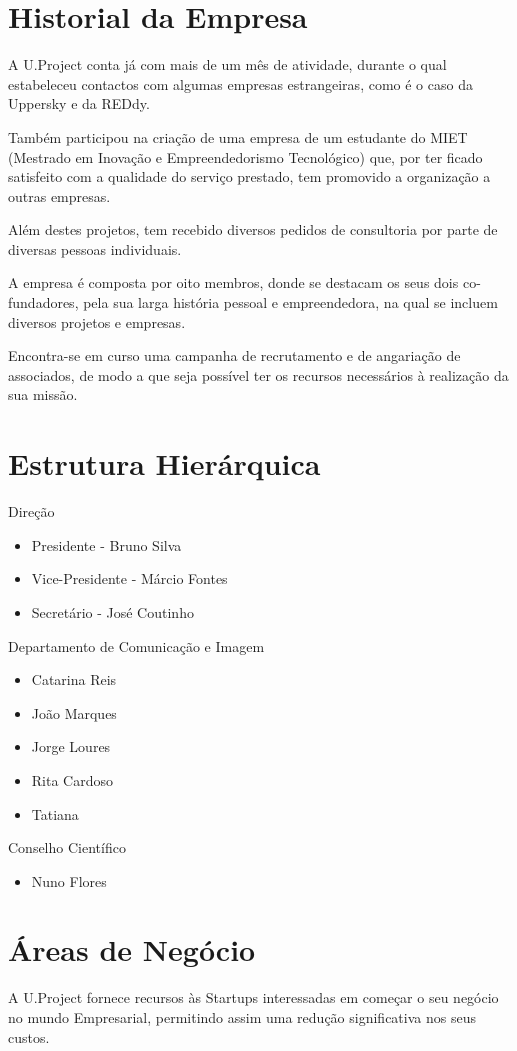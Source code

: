 \documentclass[11pt]{report}
\begin{document}
\section{Historial da Empresa}
A U.Project conta já com mais de um mês de atividade, durante o qual estabeleceu contactos com algumas empresas estrangeiras, como é o caso da Uppersky e da REDdy.

Também participou na criação de uma empresa de um estudante do MIET (Mestrado em Inovação e Empreendedorismo Tecnológico) que, por ter ficado satisfeito com a qualidade do serviço prestado, tem promovido a organização a outras empresas.

Além destes projetos, tem recebido diversos pedidos de consultoria por parte de diversas pessoas individuais.

A empresa é composta por oito membros, donde se destacam os seus dois co-fundadores, pela sua larga história pessoal e empreendedora, na qual se incluem diversos projetos e empresas. 

Encontra-se em curso uma campanha de recrutamento e de angariação de associados, de modo a que seja possível ter os recursos necessários à realização da sua missão.
\section{Estrutura Hierárquica}

Direção
\begin{itemize}
\item Presidente - Bruno Silva
\item Vice-Presidente - Márcio Fontes
\item Secretário - José Coutinho
\end{itemize}
Departamento de Comunicação e Imagem
\begin{itemize}
\item Catarina Reis
\item João Marques
\item Jorge Loures
\item Rita Cardoso
\item Tatiana
\end{itemize}
Conselho Científico
\begin{itemize}
\item Nuno Flores
\end{itemize}

\section{Áreas de Negócio}
A U.Project fornece recursos às Startups interessadas em começar o seu negócio no mundo Empresarial, permitindo assim uma redução significativa nos seus custos.
\end{document}
